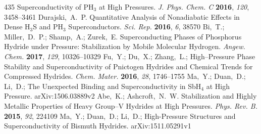 \documentclass[12pt,letterpaper,oneside]{article}
\begin{document}
\begin{mcitethebibliography}{435}
  Superconductivity of PH$_3$ at High Pressures. \emph{J. Phys. Chem. C}
  \textbf{2016}, \emph{120}, 3458--3461\relax
\mciteBstWouldAddEndPuncttrue
\mciteSetBstMidEndSepPunct{\mcitedefaultmidpunct}
{\mcitedefaultendpunct}{\mcitedefaultseppunct}\relax
\EndOfBibitem
{}
Durajski,~A.~P. Quantitative Analysis of Nonadiabatic Effects in Dense H$_3$S
  and PH$_3$ Superconductors. \emph{Sci. Rep.} \textbf{2016}, \emph{6},
  38570\relax
\mciteBstWouldAddEndPuncttrue
\mciteSetBstMidEndSepPunct{\mcitedefaultmidpunct}
{\mcitedefaultendpunct}{\mcitedefaultseppunct}\relax
\EndOfBibitem
{}
Bi,~T.; Miller,~D.~P.; Shamp,~A.; Zurek,~E. Superconducting Phases of
  Phosphorus Hydride under Pressure: Stabilization by Mobile Molecular
  Hydrogen. \emph{Angew. Chem.} \textbf{2017}, \emph{129}, 10326--10329\relax
\mciteBstWouldAddEndPuncttrue
\mciteSetBstMidEndSepPunct{\mcitedefaultmidpunct}
{\mcitedefaultendpunct}{\mcitedefaultseppunct}\relax
\EndOfBibitem
{}
Fu,~Y.; Du,~X.; Zhang,~L.;   High--Pressure
  Phase Stability and Superconductivity of Pnictogen Hydrides and Chemical
  Trends for Compressed Hydrides. \emph{Chem. Mater.} \textbf{2016}, \emph{28},
  1746--1755\relax
\mciteBstWouldAddEndPuncttrue
\mciteSetBstMidEndSepPunct{\mcitedefaultmidpunct}
{\mcitedefaultendpunct}{\mcitedefaultseppunct}\relax
\EndOfBibitem
{}
Ma,~Y.; Duan,~D.; Li,~D.;   The Unexpected
  Binding and Superconductivity in SbH$_4$ at High Pressure.
  arXiv:1506.03889v2\relax
\mciteBstWouldAddEndPuncttrue
\mciteSetBstMidEndSepPunct{\mcitedefaultmidpunct}
{\mcitedefaultendpunct}{\mcitedefaultseppunct}\relax
\EndOfBibitem
{}
Abe,~K.; Ashcroft,~N.~W. Stabilization and Highly Metallic Properties of Heavy
  Group--V Hydrides at High Pressures. \emph{Phys. Rev. B.} \textbf{2015},
  \emph{92}, 224109\relax
\mciteBstWouldAddEndPuncttrue
\mciteSetBstMidEndSepPunct{\mcitedefaultmidpunct}
{\mcitedefaultendpunct}{\mcitedefaultseppunct}\relax
\EndOfBibitem
{}
Ma,~Y.; Duan,~D.; Li,~D.;   High-Pressure
  Structures and Superconductivity of Bismuth Hydrides.
  arXiv:1511.05291v1\relax
\mciteBstWouldAddEndPuncttrue
\mciteSetBstMidEndSepPunct{\mcitedefaultmidpunct}

\end{mcitethebibliography}
\end{document}
